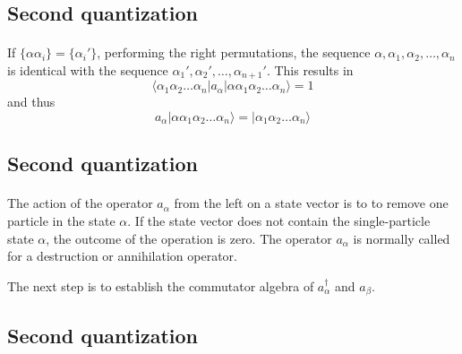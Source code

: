 \documentclass[%
twoside,                 %
final,                   %
10pt]{article}
\begin{document}
\subsection{Second quantization}

\paragraph{}
If $\{\alpha\alpha_i\} = \{\alpha_i'\}$, performing the right permutations, the sequence
$\alpha ,\alpha_1, \alpha_2, \dots, \alpha_n$ is identical with the sequence
$\alpha_1', \alpha_2', \dots, \alpha_{n+1}'$. This results in
\begin{equation}
	\langle\alpha_1\alpha_2 \dots \alpha_n|a_\alpha|\alpha\alpha_1\alpha_2 \dots \alpha_{n}\rangle = 1 \label{eq:2-14}
\end{equation}
and thus
\begin{equation}
	a_\alpha |\alpha\alpha_1\alpha_2 \dots \alpha_{n}\rangle = |\alpha_1\alpha_2 \dots \alpha_{n}\rangle \label{eq:2-15}
\end{equation}




\subsection{Second quantization}

\paragraph{}
The action of the operator 
$a_\alpha$ from the left on a state vector  is to to remove  one particle in the state
$\alpha$. 
If the state vector does not contain the single-particle state $\alpha$, the outcome of the operation is zero.
The operator  $a_\alpha$ is normally called for a destruction or annihilation operator.

The next step is to establish the  commutator algebra of $a_\alpha^{\dagger}$ and
$a_\beta$.




\subsection{Second quantization}

\end{document}
